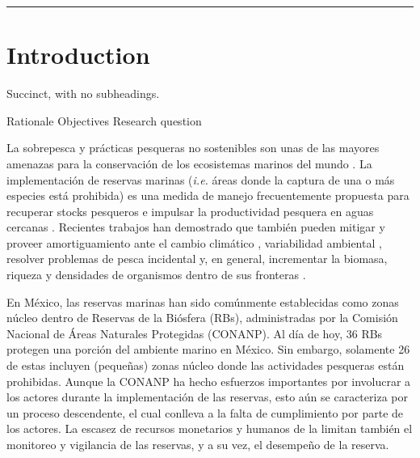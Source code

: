 \documentclass{frontiersSCNS}
\begin{document}
\begin{center}\rule{0.5\linewidth}{\linethickness}\end{center}

\section{Introduction}\label{introduction}

Succinct, with no subheadings.

Rationale Objectives Research question

La sobrepesca y prácticas pesqueras no sostenibles son unas de las
mayores amenazas para la conservación de los ecosistemas marinos del
mundo \citep{halpern_2008-dK,halpern_2017-Zi}. La implementación de
reservas marinas (\emph{i.e.} áreas donde la captura de una o más
especies está prohibida) es una medida de manejo frecuentemente
propuesta para recuperar stocks pesqueros e impulsar la productividad
pesquera en aguas cercanas
\citep{afflerbach_2014-HP,krueck_2017-J1,sala_2017-69}. Recientes
trabajos han demostrado que también pueden mitigar y proveer
amortiguamiento ante el cambio climático \citep{roberts_2017-J9},
variabilidad ambiental \citep{micheli_2012-EU}, resolver problemas de
pesca incidental \citep{hastings_2017-sm} y, en general, incrementar la
biomasa, riqueza y densidades de organismos dentro de sus fronteras
\citep{lester_2009-Ks,giakoumi_2017-V2,sala_2017-69}.

En México, las reservas marinas han sido comúnmente establecidas como
zonas núcleo dentro de Reservas de la Biósfera (RBs), administradas por
la Comisión Nacional de Áreas Naturales Protegidas (CONANP). Al día de
hoy, 36 RBs protegen una porción del ambiente marino en México. Sin
embargo, solamente 26 de estas incluyen (pequeñas) zonas núcleo donde
las actividades pesqueras están prohibidas. Aunque la CONANP ha hecho
esfuerzos importantes por involucrar a los actores durante la
implementación de las reservas, esto aún se caracteriza por un proceso
descendente, el cual conlleva a la falta de cumplimiento por parte de
los actores. La escasez de recursos monetarios y humanos de la limitan
también el monitoreo y vigilancia de las reservas, y a su vez, el
desempeño de la reserva.
\end{document}
